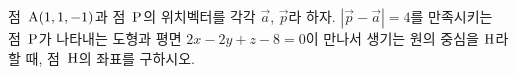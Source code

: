 점~$\mathrm{A}(1{,}\mkern3mu\mathopen{}1{,}\mkern3mu\mathopen{}-1)$과 점~$\mathrm{P}$의 위치벡터를 각각 $\vec{a}$, $\vec{p}$라 하자. $|\vec{p}-\vec{a}|=4$를 만족시키는 점~$\mathrm{P}$가 나타내는 도형과 평면 $2x-2y+z-8=0$이 만나서 생기는 원의 중심을 $\mathrm{H}$라 할 때, 점~$\mathrm{H}$의 좌표를 구하시오.
